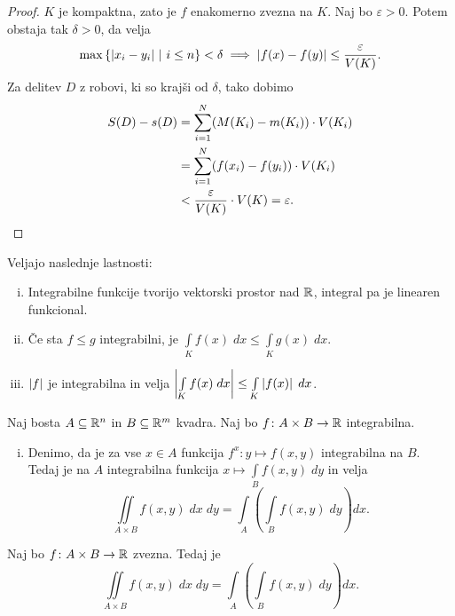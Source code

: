 \begin{proof}
$K$ je kompaktna, zato je $f$ enakomerno zvezna na $K$. Naj bo
$\varepsilon > 0$. Potem obstaja tak $\delta > 0$, da velja
\[
\max \left\{\left\lvert x_i - y_i\right\rvert~\middle\vert~i \leq n\right\} < \delta \implies
\left\lvert f(x) - f(y)\right\rvert \leq \frac{\varepsilon}{V(K)}.
\]
Za delitev $D$ z robovi, ki so krajši od $\delta$, tako dobimo
\begin{align*}
S(D) - s(D) &= \sum_{i=1}^N (M(K_i) - m(K_i)) \cdot V(K_i)
\\
&= \sum_{i=1}^N (f(x_i) - f(y_i)) \cdot V(K_i)
\\
&< \frac{\varepsilon}{V(K)} \cdot V(K) = \varepsilon. \qedhere
\end{align*}
\end{proof}

\begin{trditev}
Veljajo naslednje lastnosti:

\begin{enumerate}[i)]
\item Integrabilne funkcije tvorijo vektorski prostor nad $\mathbb{R}$,
integral pa je linearen funkcional.
\item Če sta $f \leq g$ integrabilni, je
$\int\limits_K f(x)\;dx \leq \int\limits_K g(x)\;dx$.
\item $\left\lvert f\right\rvert$ je integrabilna in velja
$\left\lvert \int\limits_K f(x)\;dx\right\rvert \leq \int\limits_K \left\lvert f(x)\right\rvert\;dx$.
\end{enumerate}
\end{trditev}

\obvs

\begin{izrek}[Fubini]
Naj bosta $A \subseteq \mathbb{R}^n$ in $B \subseteq \mathbb{R}^m$ kvadra. Naj bo
$f \colon A \times B \to \mathbb{R}$ integrabilna.

\begin{enumerate}[i)]
\item Denimo, da je za vse $x \in A$ funkcija
$f^x \colon y \mapsto f(x,y)$ integrabilna na $B$. Tedaj je na $A$
integrabilna funkcija $x \mapsto \int\limits_B f(x,y)\;dy$ in velja
\[
\iint\limits_{A \times B} f(x,y)\;dx\;dy =
\int\limits_A \left(\int\limits_B f(x,y)\;dy\right) dx.
\]
\end{enumerate}
\end{izrek}

\begin{posledica}
Naj bo $f \colon A \times B \to \mathbb{R}$ zvezna. Tedaj je
\[
\iint\limits_{A \times B} f(x,y)\;dx\;dy =
\int\limits_A \left(\int\limits_B f(x,y)\;dy\right) dx.
\]
\end{posledica}

